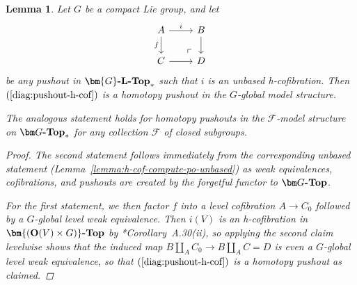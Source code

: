 \documentclass[reqno]{memo-l}
\theoremstyle{mythm}
\newtheorem{lemma}[thm]{Lemma}
\theoremstyle{definition}
\numberwithin{equation}{section}
\newcommand{\Ff}{{\mathcal{F}}}
\newcommand{\cat}[1]{\textbf{\textup{#1}}}
\renewcommand{\O}{{\textup{O}}}
\begin{document}
\begin{lemma}\label{lemma:h-cof-compute-po}
    Let $G$ be a compact Lie group, and let
    \begin{equation}\label{diag:pushout-h-cof}
        \begin{tikzcd}
            A\arrow[r,"i"]\arrow[d,"f"']\arrow[dr,phantom,"\ulcorner"{very near end}] & B\arrow[d]\\
            C\arrow[r] & D
        \end{tikzcd}
    \end{equation}
    be any pushout in $\cat{$\bm{G}$-$\cat{L}$-Top}_*$ such that $i$ is an unbased h-cofibration. Then $(\ref{diag:pushout-h-cof})$ is a homotopy pushout in the $G$-global model structure.

    The analogous statement holds for homotopy pushouts in the $\Ff$-model structure on $\cat{$\bm G$-Top}_*$ for any collection $\Ff$ of closed subgroups.
    \begin{proof}
        The second statement follows immediately from the corresponding unbased statement (Lemma~\ref{lemma:h-cof-compute-po-unbased}) as weak equivalences, cofibrations, and pushouts are created by the forgetful functor to $\cat{$\bm G$-Top}$.

        For the first statement, we then factor $f$ into a level cofibration $A\to C_0$ followed by a $G$-global level weak equivalence. Then $i(V)$ is an h-cofibration in $\cat{$\bm{(\O(V)\times G)}$-Top}$ by \cite{schwede2018global}*{Corollary~A.30(ii)}, so applying the second claim levelwise shows that the induced map $B\amalg_AC_0\to B\amalg_AC=D$ is even a $G$-global level weak equivalence, so that $(\ref{diag:pushout-h-cof})$ is a homotopy pushout as claimed.
    \end{proof}
\end{lemma}
\end{document}
